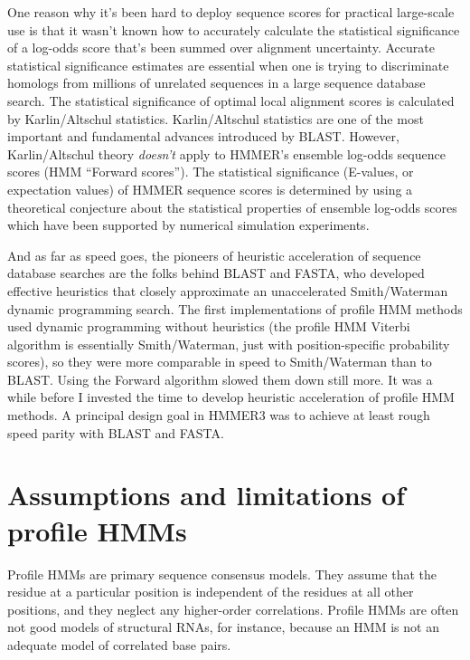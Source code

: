 One reason why it's been hard to deploy sequence scores for practical
large-scale use is that it wasn't known how to accurately calculate
the statistical significance of a log-odds score that's been summed
over alignment uncertainty. Accurate statistical significance
estimates are essential when one is trying to discriminate homologs
from millions of unrelated sequences in a large sequence database
search. The statistical significance of optimal local alignment scores
is calculated by Karlin/Altschul statistics.\cite{Karlin90}
Karlin/Altschul statistics are one of the most important and
fundamental advances introduced by BLAST.  However, Karlin/Altschul
theory \emph{doesn't} apply to HMMER's ensemble log-odds sequence
scores (HMM ``Forward scores''). The statistical significance
(E-values, or expectation values) of HMMER sequence scores is
determined by using a theoretical conjecture about the statistical
properties of ensemble log-odds scores which have been supported by
numerical simulation experiments.\cite{Eddy08}

And as far as speed goes, the pioneers of heuristic acceleration of
sequence database searches are the folks behind BLAST and FASTA, who
developed effective heuristics that closely approximate an
unaccelerated Smith/Waterman dynamic programming search.  The first
implementations of profile HMM methods used dynamic programming
without heuristics (the profile HMM Viterbi algorithm is essentially
Smith/Waterman, just with position-specific probability scores), so
they were more comparable in speed to Smith/Waterman than to BLAST.
Using the Forward algorithm slowed them down still more. It was a
while before I invested the time to develop heuristic acceleration of
profile HMM methods. A principal design goal in HMMER3 was to achieve
at least rough speed parity with BLAST and FASTA.


\section{Assumptions and limitations of profile HMMs}

Profile HMMs are primary sequence consensus models.  They assume that
the residue at a particular position is independent of the residues at
all other positions, and they neglect any higher-order correlations.
Profile HMMs are often not good models of structural RNAs, for
instance, because an HMM is not an adequate model of correlated base
pairs.

